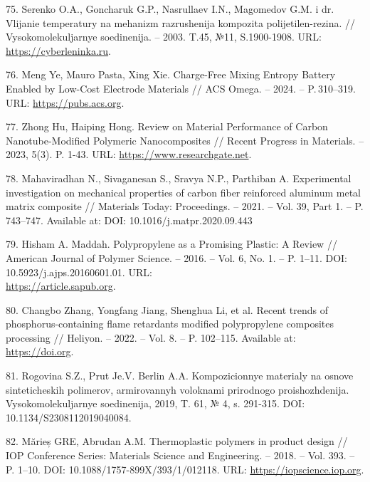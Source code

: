 \begin{references}
75. Serenko O.A., Goncharuk G.P., Nasrullaev I.N., Magomedov G.M. i
dr. Vlijanie temperatury na mehanizm razrushenija kompozita
polijetilen-rezina. // Vysokomolekuljarnye soedinenija. – 2003. T.45,
№11,
S.1900-1908. URL: \href{https://cyberleninka.ru/article/n/vliyanie-temperatury-na-mehanizm-razrusheniya-kompozita-polietilen-rezina?utm_source}{https://cyberleninka.ru}.

76. Meng Ye, Mauro Pasta, Xing Xie. Charge-Free Mixing Entropy Battery
Enabled by Low-Cost Electrode Materials // ACS Omega. – 2024. –
P. 310–319. URL: \href{https://pubs.acs.org/doi/10.1021/acsomega.9b00863}{https://pubs.acs.org}.

77. Zhong Hu, Haiping Hong. Review on Material Performance of Carbon
Nanotube-Modified Polymeric Nanocomposites // Recent Progress in
Materials. – 2023,
5(3). P. 1-43. URL: \href{https://www.researchgate.net/publication/373330869_Review_on_Material_Performance_of_Carbon_Nanotube-Modified_Polymeric_Nanocomposites}{https://www.researchgate.net}.

78. Mahaviradhan N., Sivaganesan S., Sravya N.P., Parthiban
A. Experimental investigation on mechanical properties of carbon fiber
reinforced aluminum metal matrix composite // Materials Today:
Proceedings. – 2021. – Vol. 39, Part 1. – P. 743–747. Available at:
DOI: 10.1016/j.matpr.2020.09.443

79. Hisham A. Maddah. Polypropylene as a Promising Plastic: A Review
// American Journal of Polymer Science. – 2016. – Vol. 6, No. 1. –
P. 1–11. DOI:
10.5923/j.ajps.20160601.01. URL: \\\href{https://article.sapub.org/10.5923.j.ajps.20160601.01.html}{https://article.sapub.org}.

80. Changbo Zhang, Yongfang Jiang, Shenghua Li, et al. Recent trends
of phosphorus-containing flame retardants modified polypropylene
composites processing // Heliyon. – 2022. – Vol. 8. –
P. 102–115. Available
at: \href{https://doi.org/10.1016/j.heliyon.2022.e08711}{https://doi.org}.

81. Rogovina S.Z., Prut Je.V. Berlin A.A. Kompozicionnye materialy na
osnove sinteticheskih polimerov, armirovannyh voloknami prirodnogo
proishozhdenija. Vysokomolekuljarnye soedinenija, 2019, T. 61, № 4,
s. 291-315. DOI: 10.1134/S2308112019040084.

82. Mărieș GRE, Abrudan A.M. Thermoplastic polymers in product design
// IOP Conference Series: Materials Science and Engineering. – 2018. –
Vol. 393. – P. 1–10. DOI:
10.1088/1757-899X/393/1/012118. URL: \href{https://iopscience.iop.org/article/10.1088/1757-899X/393/1/012118}{https://iopscience.iop.org}.


\end{references}

